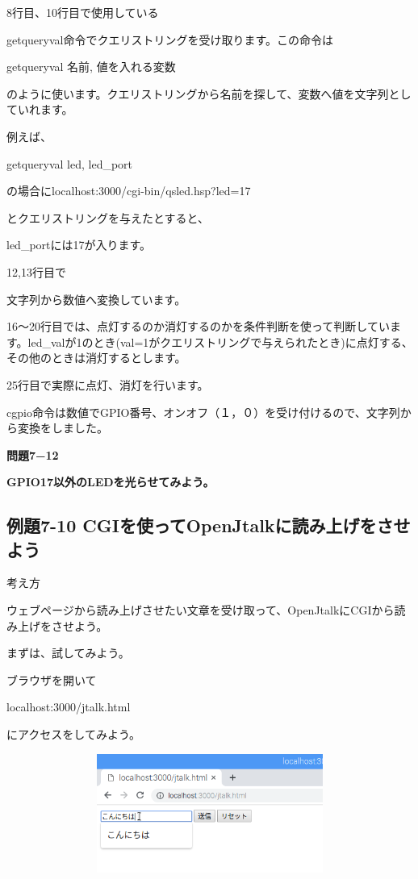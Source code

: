 \documentclass[a4paper,12pt,dvipdfmx]{jarticle}
\begin{document}
\bigskip



\bigskip


\bigskip

8行目、10行目で使用している

getqueryval命令でクエリストリングを受け取ります。この命令は

getqueryval 名前, 値を入れる変数

のように使います。クエリストリングから名前を探して、変数へ値を文字列としていれます。

例えば、

getqueryval led, led\_port

の場合にlocalhost:3000/cgi-bin/qsled.hsp?led=17

とクエリストリングを与えたとすると、

led\_portには17が入ります。

12,13行目で

文字列から数値へ変換しています。

16〜20行目では、点灯するのか消灯するのかを条件判断を使って判断しています。led\_valが1のとき(val=1がクエリストリングで与えられたとき)に点灯する、その他のときは消灯するとします。

25行目で実際に点灯、消灯を行います。

cgpio命令は数値でGPIO番号、オンオフ（１，０）を受け付けるので、文字列から変換をしました。


\bigskip

{\bfseries
問題7−12}

{\bfseries
GPIO17以外のLEDを光らせてみよう。}


\bigskip


\bigskip

\clearpage\subsection*{\rmfamily 例題7-10
CGIを使ってOpenJtalkに読み上げをさせよう}
考え方

ウェブページから読み上げさせたい文章を受け取って、OpenJtalkにCGIから読み上げをさせよう。

まずは、試してみよう。

ブラウザを開いて

localhost:3000/jtalk.html

にアクセスをしてみよう。

%


\centering
\includegraphics[width=14.319cm,height=3.902cm]{ome7-img056.png}
\flushleft
\end{document}
